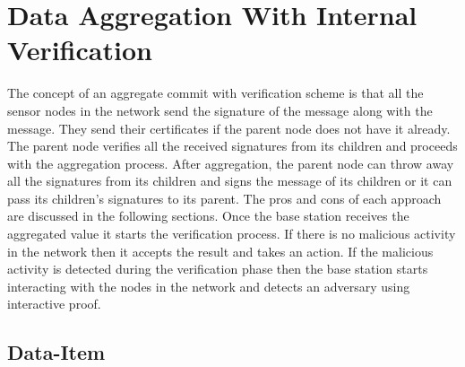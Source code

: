 \chapter{Data Aggregation With Internal Verification} %
\label{cha:Data Aggregation With Internal Verification}

	The concept of an aggregate commit with verification scheme is that all the sensor nodes in the network send the signature of the message along with the message.
	They send their certificates if the parent node does not have it already.
	The parent node verifies all the received signatures from its children and proceeds with the aggregation process.
	After aggregation, the parent node can throw away all the signatures from its children and signs the message of its children or it can pass its children's signatures to its parent. 
	The pros and cons of each approach are discussed in the following sections. 
	Once the base station receives the aggregated value it starts the verification process. 
	If there is no malicious activity in the network then  it accepts the result and takes an action.
	If the malicious activity is detected during the verification phase then the base station starts interacting with the nodes in the network and detects an adversary using interactive proof. 

\section{Data-Item}
	
